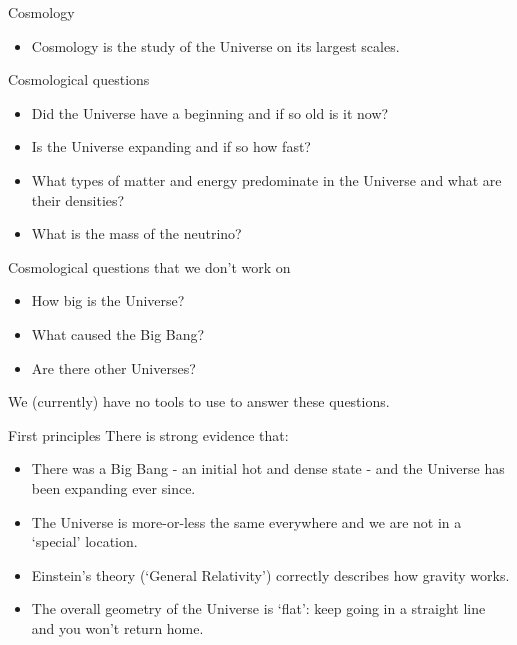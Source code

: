 \documentclass[usenames,dvipsnames]{beamer}
\begin{document}
\begin{frame}{Cosmology}
  \begin{block}{}
    \begin{itemize}
      \item{Cosmology is the study of the Universe on its largest scales.}
    \end{itemize}
  \end{block}
\end{frame}

\begin{frame}{Cosmological questions}
  \begin{block}{}
    \begin{itemize}
      \item{Did the Universe have a beginning and if so old is it now?}
      \item{Is the Universe expanding and if so how fast?}
      \item{What types of matter and energy predominate in the Universe and what are their densities?}
      \item{What is the mass of the neutrino?}
    \end{itemize}
  \end{block}
\end{frame}

\begin{frame}{Cosmological questions that we don't work on}
  \begin{block}{}
    \begin{itemize}
      \item{How big is the Universe?}
      \item{What caused the Big Bang?}
      \item{Are there other Universes?}
    \end{itemize}
    We (currently) have no tools to use to answer these questions.
  \end{block}
\end{frame}


\begin{frame}{First principles}
  There is strong evidence that:
  \begin{block}{}
    \begin{itemize}
      \item{There was a Big Bang - an initial hot and dense state - and the Universe has been expanding ever since.}
      \item{The Universe is more-or-less the same everywhere and we are not in a `special' location.}
      \item{Einstein's theory (`General Relativity') correctly describes how gravity works.}
      \item{The overall geometry of the Universe is `flat': keep going in a straight line and you won't return home.}
    \end{itemize}
  \end{block}
\end{frame}
\end{document}
